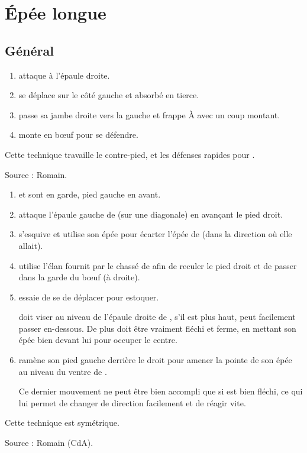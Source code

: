 \chapter{Épée longue}

\section{Général}

\begin{technique}

\begin{enumerate}
	\item \A attaque à l'épaule droite.
	
	\item \D se déplace sur le côté gauche et absorbé en tierce.
	
	\item \D passe sa jambe droite vers la gauche et frappe À avec un coup montant.
	
	\item \A monte en bœuf pour se défendre.
\end{enumerate}

Cette technique travaille le contre-pied, et les défenses rapides pour \A.

Source : Romain.

\end{technique}


\begin{technique}
\begin{enumerate}
	\item \A et \D sont en garde, pied gauche en avant.
	
	\item \A attaque l'épaule gauche de \D (sur une diagonale) en avançant le pied droit.
	
	\item \D s'esquive et utilise son épée pour écarter l'épée de \A (dans la direction où elle allait).
	
	\item \A utilise l'élan fournit par le chassé de \D afin de reculer le pied droit et de passer dans la garde du bœuf (à droite).
	
	\item \D essaie de se de déplacer pour estoquer.
	
	\A doit viser au niveau de l'épaule droite de \D, s'il est plus haut, \D peut facilement passer en-dessous. De plus \A doit être vraiment fléchi et ferme, en mettant son épée bien devant lui pour occuper le centre.
	
	\item \A ramène son pied gauche derrière le droit pour amener la pointe de son épée au niveau du ventre de \D.
	
	Ce dernier mouvement ne peut être bien accompli que si \A est bien fléchi, ce qui lui permet de changer de direction facilement et de réagir vite.
\end{enumerate}

Cette technique est symétrique.

Source : Romain (CdA).
\end{technique}


